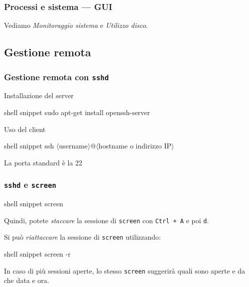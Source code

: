 \documentclass{beamer}
\newenvironment{shell}{\par\vspace{.5em}\begin{beamercolorbox}[rounded=true,sep=.2em]{shell snippet}\ttfamily {\color{blue}\$}}{\end{beamercolorbox}}
\newcommand{\param}[1]{$\langle$#1$\rangle$}
\begin{document}
\begin{frame}
  \frametitle{Processi e sistema --- GUI}
  Vediamo \textit{Monitoraggio sistema} e \textit{Utilizzo disco}.
\end{frame}

\subsection{Gestione remota}

\begin{frame}[t]
  \frametitle{Gestione remota con \texttt{sshd}}
  \begin{block}{Installazione del server}
    \begin{shell}
      sudo apt-get install openssh-server
    \end{shell}
  \end{block}

  \begin{block}{Uso del client}
    \begin{shell}
      ssh \alert{\param{username}}@\alert{\param{hostname o indirizzo IP}}
    \end{shell}
  \end{block}
  La porta standard è la 22

\end{frame}

\begin{frame}
  \frametitle{\texttt{sshd} e \texttt{screen}}

    \begin{shell}
      screen
    \end{shell}
    Quindi, potete \textit{staccare} la sessione di \texttt{screen} con
    \texttt{Ctrl + A} e poi \texttt{d}.

    Si può \textit{riattaccare} la sessione di \texttt{screen} utilizzando:
    \begin{shell}
      screen -r
    \end{shell}
    In caso di più sessioni aperte, lo stesso \texttt{screen} suggerirà quali
    sono aperte e da che data e ora.
\end{frame}
\end{document}
